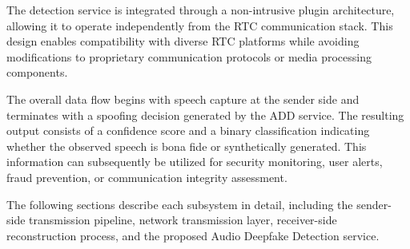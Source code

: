 The detection service is integrated through a non-intrusive plugin architecture, allowing it to operate independently from the RTC communication stack. This design enables compatibility with diverse RTC platforms while avoiding modifications to proprietary communication protocols or media processing components.

The overall data flow begins with speech capture at the sender side and terminates with a spoofing decision generated by the ADD service. The resulting output consists of a confidence score and a binary classification indicating whether the observed speech is bona fide or synthetically generated. This information can subsequently be utilized for security monitoring, user alerts, fraud prevention, or communication integrity assessment.

The following sections describe each subsystem in detail, including the sender-side transmission pipeline, network transmission layer, receiver-side reconstruction process, and the proposed Audio Deepfake Detection service.